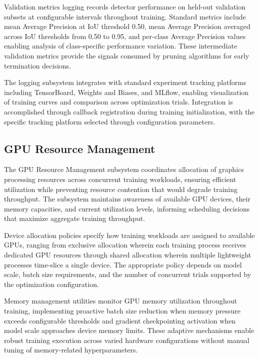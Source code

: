 Validation metrics logging records detector performance on held-out validation subsets at configurable intervals throughout training. Standard metrics include mean Average Precision at IoU threshold 0.50, mean Average Precision averaged across IoU thresholds from 0.50 to 0.95, and per-class Average Precision values enabling analysis of class-specific performance variation. These intermediate validation metrics provide the signals consumed by pruning algorithms for early termination decisions.

The logging subsystem integrates with standard experiment tracking platforms including TensorBoard, Weights and Biases, and MLflow, enabling visualization of training curves and comparison across optimization trials. Integration is accomplished through callback registration during training initialization, with the specific tracking platform selected through configuration parameters.

\subsection{GPU Resource Management}

The GPU Resource Management subsystem coordinates allocation of graphics processing resources across concurrent training workloads, ensuring efficient utilization while preventing resource contention that would degrade training throughput. The subsystem maintains awareness of available GPU devices, their memory capacities, and current utilization levels, informing scheduling decisions that maximize aggregate training throughput.

Device allocation policies specify how training workloads are assigned to available GPUs, ranging from exclusive allocation wherein each training process receives dedicated GPU resources through shared allocation wherein multiple lightweight processes time-slice a single device. The appropriate policy depends on model scale, batch size requirements, and the number of concurrent trials supported by the optimization configuration.

Memory management utilities monitor GPU memory utilization throughout training, implementing proactive batch size reduction when memory pressure exceeds configurable thresholds and gradient checkpointing activation when model scale approaches device memory limits. These adaptive mechanisms enable robust training execution across varied hardware configurations without manual tuning of memory-related hyperparameters.

